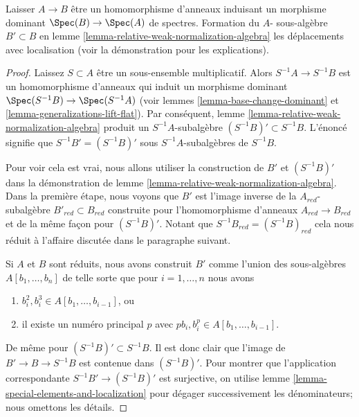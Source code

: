 \begin{lemma}

\label{lemma-relative-weak-normalization-localization}

Laisser $A \to B$ être un homomorphisme d'anneaux induisant un morphisme dominant
$\Spec(B) \to \Spec(A)$ de spectres. Formation du $A$- sous-algèbre
$B' \subset B$ en lemme \ref{lemma-relative-weak-normalization-algebra}
les déplacements avec localisation (voir la démonstration pour les explications).

\end{lemma}

\begin{proof}
Laissez $S \subset A$ être un sous-ensemble multiplicatif. Alors $S^{-1}A \to S^{-1}B$ est un homomorphisme d'anneaux qui induit un morphisme dominant $\Spec(S^{-1}B) \to \Spec(S^{-1}A)$ (voir lemmes \ref{lemma-base-change-dominant} et \ref{lemma-generalizations-lift-flat}). Par conséquent, lemme \ref{lemma-relative-weak-normalization-algebra} produit un $S^{-1}A$-subalgèbre $(S^{-1}B)' \subset S^{-1}B$. L'énoncé signifie que $S^{-1}B' = (S^{-1}B)'$ sous $S^{-1}A$-subalgèbres de $S^{-1}B$.

\medskip\noindent
Pour voir cela est vrai, nous allons utiliser la construction de $B'$ et $(S^{-1}B)'$ dans la démonstration de lemme \ref{lemma-relative-weak-normalization-algebra}. Dans la première étape, nous voyons que $B'$ est l'image inverse de la $A_{red}$-subalgèbre $B'_{red} \subset B_{red}$ construite pour l'homomorphisme d'anneaux $A_{red} \to B_{red}$ et de la même façon pour $(S^{-1}B)'$. Notant que $S^{-1}B_{red} = (S^{-1}B)_{red}$ cela nous réduit à l'affaire discutée dans le paragraphe suivant.

\medskip\noindent
Si $A$ et $B$ sont réduits, nous avons construit $B'$ comme l'union des sous-algèbres $A[b_1, \ldots, b_n]$ de telle sorte que pour $i = 1, \ldots, n$ nous avons
\begin{enumerate}
\item $b_i^2, b_i^3 \in A[b_1, \ldots, b_{i - 1}]$, ou
\item il existe un numéro principal $p$ avec $pb_i, b_i^p \in A[b_1, \ldots, b_{i - 1}]$.
\end{enumerate}
De même pour $(S^{-1}B)' \subset S^{-1}B$. Il est donc clair que l'image de $B' \to B \to S^{-1}B$ est contenue dans $(S^{-1}B)'$. Pour montrer que l'application correspondante $S^{-1}B' \to (S^{-1}B)'$ est surjective, on utilise lemme \ref{lemma-special-elements-and-localization} pour dégager successivement les dénominateurs; nous omettons les détails.
\end{proof}

